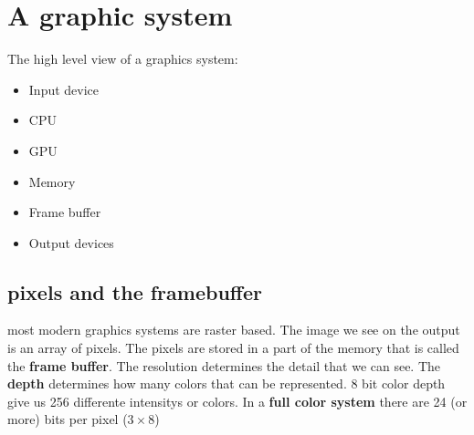 \section{A graphic system}
The high level view of a graphics system:
\begin{itemize}
	\item Input device
	\item CPU
	\item GPU
	\item Memory
	\item Frame buffer
	\item Output devices
\end{itemize}


\subsection*{pixels and the framebuffer}
most modern graphics systems are raster based. The image we see on the output is an array of pixels. The pixels are stored in a part of the memory that is called the \textbf{frame buffer}. The resolution determines the detail that we can see. The \textbf{depth} determines how many colors that can be represented. 8 bit color depth give us 256 differente intensitys or colors. In a \textbf{full color system} there are 24 (or more) bits per pixel ($3 \times 8$) 

